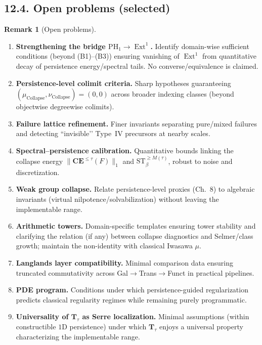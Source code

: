 \documentclass[11pt]{article}
\numberwithin{equation}{section}
\theoremstyle{plain}
\theoremstyle{definition}
\theoremstyle{remark}
\DeclareMathOperator{\Ext}{Ext}
\DeclareRobustCommand{\hyp}{\nobreakdash-}
\theoremstyle{plain}
\theoremstyle{definition}
\numberwithin{equation}{section}
\theoremstyle{definition}
\newtheorem{remark}[theorem]{Remark}
\DeclareRobustCommand{\muc}{\mu_{\mathrm{Collapse}}}
\DeclareRobustCommand{\nuc}{\nu_{\mathrm{Collapse}}}
\numberwithin{equation}{section}
\theoremstyle{plain}
\theoremstyle{definition}
\theoremstyle{remark}
\providecommand{\muc}{\mu_{\mathrm{Collapse}}}
\providecommand{\nuc}{\nu_{\mathrm{Collapse}}}
\begin{document}
\subsection*{12.4. Open problems (selected)}
\begin{remark}[Open problems]\label{rk:12-open}
\hfill
\begin{enumerate}
  \item \textbf{Strengthening the bridge \( \mathrm{PH}_1\to \Ext^1 \).} Identify domain\hyp wise sufficient conditions (beyond (B1)–(B3)) ensuring vanishing of \(\Ext^1\) from quantitative decay of persistence energy/spectral tails. No converse/equivalence is claimed.
  \item \textbf{Persistence\hyp level colimit criteria.} Sharp hypotheses guaranteeing \((\muc,\nuc)=(0,0)\) across broader indexing classes (beyond objectwise degreewise colimits).
  \item \textbf{Failure lattice refinement.} Finer invariants separating pure/mixed failures and detecting “invisible’’ Type~IV precursors at nearby scales.
  \item \textbf{Spectral–persistence calibration.} Quantitative bounds linking the collapse energy \(\|\mathbf{CE}^{\le \tau}(F)\|_{1}\) and \(\mathrm{ST}_{\beta}^{\ge M(\tau)}\), robust to noise and discretization.
  \item \textbf{Weak group collapse.} Relate persistence\hyp level proxies (Ch.~8) to algebraic invariants (virtual nilpotence/solvabilization) without leaving the implementable range.
  \item \textbf{Arithmetic towers.} Domain\hyp specific templates ensuring tower stability and clarifying the relation (if any) between collapse diagnostics and Selmer/class growth; maintain the non\hyp identity with classical Iwasawa \(\mu\).
  \item \textbf{Langlands layer compatibility.} Minimal comparison data ensuring truncated commutativity across Gal\(\to\)Trans\(\to\)Funct in practical pipelines.
  \item \textbf{PDE program.} Conditions under which persistence\hyp guided regularization predicts classical regularity regimes while remaining purely programmatic.
  \item \textbf{Universality of \(\mathbf{T}_\tau\) as Serre localization.} Minimal assumptions (within constructible \(1\)D persistence) under which \(\mathbf{T}_\tau\) enjoys a universal property characterizing the implementable range.
\end{enumerate}
\end{remark}
\end{document}
